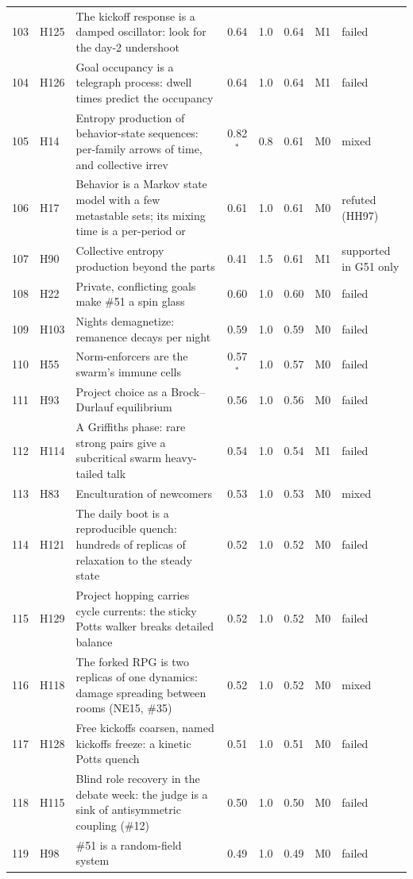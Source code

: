 \begin{table}[p]
\begin{tabular}{@{}r l p{} c c c c l@{}}
103 & H125 & The kickoff response is a damped oscillator: look for the day-2 undershoot & 0.64 & 1.0 & 0.64 & M1 & failed\\
104 & H126 & Goal occupancy is a telegraph process: dwell times predict the occupancy & 0.64 & 1.0 & 0.64 & M1 & failed\\
105 & H14 & Entropy production of behavior-state sequences: per-family arrows of time, and collective irrev & 0.82$^\ast$ & 0.8 & 0.61 & M0 & mixed\\
106 & H17 & Behavior is a Markov state model with a few metastable sets; its mixing time is a per-period or & 0.61 & 1.0 & 0.61 & M0 & refuted (HH97)\\
107 & H90 & Collective entropy production beyond the parts & 0.41 & 1.5 & 0.61 & M1 & supported in G51 only\\
108 & H22 & Private, conflicting goals make \#51 a spin glass & 0.60 & 1.0 & 0.60 & M0 & failed\\
109 & H103 & Nights demagnetize: remanence decays per night & 0.59 & 1.0 & 0.59 & M0 & failed\\
110 & H55 & Norm-enforcers are the swarm's immune cells & 0.57$^\ast$ & 1.0 & 0.57 & M0 & failed\\
111 & H93 & Project choice as a Brock--Durlauf equilibrium & 0.56 & 1.0 & 0.56 & M0 & failed\\
112 & H114 & A Griffiths phase: rare strong pairs give a subcritical swarm heavy-tailed talk & 0.54 & 1.0 & 0.54 & M1 & failed\\
113 & H83 & Enculturation of newcomers & 0.53 & 1.0 & 0.53 & M0 & mixed\\
114 & H121 & The daily boot is a reproducible quench: hundreds of replicas of relaxation to the steady state & 0.52 & 1.0 & 0.52 & M0 & failed\\
115 & H129 & Project hopping carries cycle currents: the sticky Potts walker breaks detailed balance & 0.52 & 1.0 & 0.52 & M0 & failed\\
116 & H118 & The forked RPG is two replicas of one dynamics: damage spreading between rooms (NE15, \#35) & 0.52 & 1.0 & 0.52 & M0 & mixed\\
117 & H128 & Free kickoffs coarsen, named kickoffs freeze: a kinetic Potts quench & 0.51 & 1.0 & 0.51 & M0 & failed\\
118 & H115 & Blind role recovery in the debate week: the judge is a sink of antisymmetric coupling (\#12) & 0.50 & 1.0 & 0.50 & M0 & failed\\
119 & H98 & \#51 is a random-field system & 0.49 & 1.0 & 0.49 & M0 & failed\\

\end{tabular}
\end{table}

